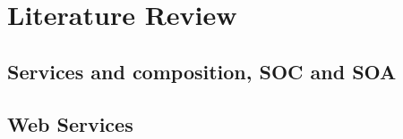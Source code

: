 \section{Literature Review}

\subsection{Services and composition, SOC and SOA}
% 
% 
% 
% 

\subsection{Web Services}
% 

